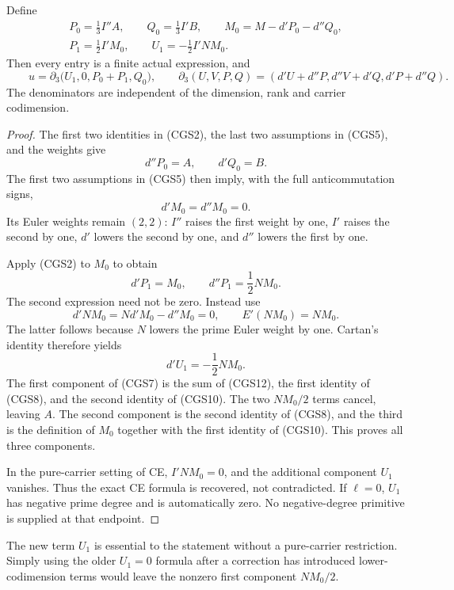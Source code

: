 \begin{theorem}
Define
\[
\begin{gathered}
 P_0=\frac13 I''A,\qquad Q_0=\frac13 I'B,
 \qquad M_0=M-d'P_0-d''Q_0,\\
 P_1=\frac12 I'M_0,\qquad
 U_1=-\frac12 I'NM_0.
\end{gathered}
 \tag{CGS6}
\]
Then every entry is a finite actual expression, and
\[
 \boxed{\qquad
 u=\partial_3\bigl(U_1,0,P_0+P_1,Q_0\bigr),
 \qquad
 \partial_3(U,V,P,Q)=(d'U+d''P,d''V+d'Q,d'P+d''Q).
 \qquad}
 \tag{CGS7}
\]
The denominators are independent of the dimension, rank and
carrier codimension.
\end{theorem}

\begin{proof}
The first two identities in (CGS2), the last two assumptions in
(CGS5), and the weights give
\[
                   d''P_0=A,\qquad d'Q_0=B.
 \tag{CGS8}
\]
The first two assumptions in (CGS5) then imply, with the full
anticommutation signs,
\[
                          d'M_0=d''M_0=0.
 \tag{CGS9}
\]
Its Euler weights remain $(2,2)$: $I''$ raises the first
weight by one, $I'$ raises the second by one, $d'$ lowers
the second by one, and $d''$ lowers the first by one.

Apply (CGS2) to $M_0$ to obtain
\[
                   d'P_1=M_0,\qquad d''P_1=\frac12 NM_0.
 \tag{CGS10}
\]
The second expression need not be zero.  Instead use
\[
 d'NM_0=Nd'M_0-d''M_0=0,
                       \qquad E'(NM_0)=NM_0.
 \tag{CGS11}
\]
The latter follows because $N$ lowers the prime Euler weight
by one.  Cartan's identity therefore yields
\[
                          d'U_1=-\frac12 NM_0.
 \tag{CGS12}
\]
The first component of (CGS7) is the sum of (CGS12), the first
identity of (CGS8), and the second identity of (CGS10).  The
two $NM_0/2$ terms cancel, leaving $A$.  The second component
is the second identity of (CGS8), and the third is the
definition of $M_0$ together with the first identity of
(CGS10).  This proves all three components.

In the pure-carrier setting of CE, $I'NM_0=0$, and the
additional component $U_1$ vanishes.  Thus the exact CE
formula is recovered, not contradicted.  If $\ell=0$,
$U_1$ has negative prime degree and is automatically zero.
No negative-degree primitive is supplied at that endpoint.
\end{proof}

The new term $U_1$ is essential to the statement without a
pure-carrier restriction.  Simply using the older $U_1=0$
formula after a correction has introduced lower-codimension
terms would leave the nonzero first component $NM_0/2$.

